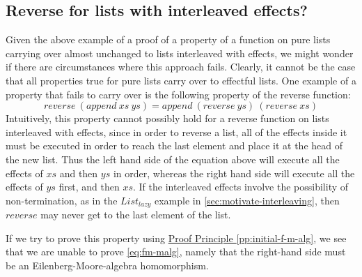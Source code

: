 \documentclass{jfp1}
\newcommand{\proofprinref}[1]{\hyperref[#1]{Proof Principle \ref*{#1}}}
\begin{document}
\subsection{Reverse for lists with interleaved effects?}
\label{sec:reverse}

Given the above example of a proof of a property of a function on pure
lists carrying over almost unchanged to lists interleaved with
effects, we might wonder if there are circumstances where this
approach fails. Clearly, it cannot be the case that all properties
true for pure lists carry over to effectful lists. One example of a
property that fails to carry over is the following property of the
reverse function:
\begin{equation}\label{eq:reverse-append}
  \mathit{reverse}~(\mathit{append}~\mathit{xs}~\mathit{ys}) = \mathit{append}~(\mathit{reverse}~\mathit{ys})~(\mathit{reverse}~\mathit{xs})
\end{equation}
Intuitively, this property cannot possibly hold for a reverse function
on lists interleaved with effects, since in order to reverse a list,
all of the effects inside it must be executed in order to reach the
last element and place it at the head of the new list. Thus the left
hand side of the equation above will execute all the effects of
$\mathit{xs}$ and then $\mathit{ys}$ in order, whereas the right hand
side will execute all the effects of $\mathit{ys}$ first, and then
$\mathit{xs}$. If the interleaved effects involve the possibility of
non-termination, as in the $\mathit{List_{lazy}}$ example in
\autoref{sec:motivate-interleaving}, then $\mathit{reverse}$ may never
get to the last element of the list.

If we try to prove this property using
\proofprinref{pp:initial-f-m-alg}, we see that we are unable to prove
\autoref{eq:fm-malg}, namely that the right-hand side must be an
Eilenberg-Moore-algebra homomorphism.
\end{document}
